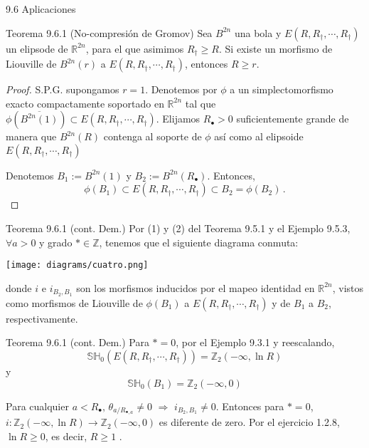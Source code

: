 \documentclass{beamer}
\begin{document}
\begin{frame}{9.6 Aplicaciones}
\begin{block}{Teorema 9.6.1 (No-compresi\'on de Gromov) } Sea $B^{2n}$ una bola y $E(R,R_{\dagger},\cdots,R_{\dagger})$ un elipsode de $\mathbb{R}^{2n}$, para el que asimimos $R_{\dagger}\geq R$. Si existe un morfismo de Liouville de $B^{2n}(r)$ a $E(R,R_{\dagger},\cdots,R_{\dagger})$, entonces $R\geq r$.
\end{block}
\begin{proof}\renewcommand{\qedsymbol}{}
S.P.G. supongamos $r=1$. Denotemos por $\phi$ a un simplectomorfismo exacto compactamente soportado en $\mathbb{R}^{2n}$ tal que $\phi(\overline{B^{2n}(1)})\subset E(R,R_{\dagger},\cdots,R_{\dagger})$. Elijamos $R_{\bullet}>0$ suficientemente grande de manera que $B^{2n}(R)$ contenga al soporte de $\phi$ as\'i como al elipsoide $E(R,R_{\dagger},\cdots,R_{\dagger})$

Denotemos $B_1:=B^{2n}(1)$ y $B_2:=B^{2n}(R_{\bullet})$. Entonces,
$$\phi(B_1)\subset E(R,R_{\dagger},\cdots,R_{\dagger})\subset B_{2}=\phi(B_2)\,.$$
\end{proof}
\end{frame}

\begin{frame}{Teorema 9.6.1 (cont. Dem.)}
Por (1) y (2) del Teorema 9.5.1 y el Ejemplo 9.5.3, $\forall a>0$ y grado $\ast\in \mathbb{Z}$, tenemos que el siguiente diagrama conmuta:
\begin{center}
\texttt{[image: diagrams/cuatro.png]}
\end{center}
donde $i$ e $i_{B_2,B_1}$ son los morfismos inducidos por el mapeo identidad en $\mathbb{R}^{2n}$, vistos como morfismos de Liouville de $\phi(B_1)$ a $E(R,R_{\dagger},\cdots,R_{\dagger})$ y de $B_{1}$ a $B_{2}$, respectivamente.
\end{frame}


\begin{frame}{Teorema 9.6.1 (cont. Dem.)}
Para $\ast=0$, por el Ejemplo 9.3.1 y reescalando, $$\mathbb{SH}_{0}(E(R,R_{\dagger},\cdots,R_{\dagger}))=\mathbb{Z}_{2}(-\infty,\ln R)$$ y $$\mathbb{SH}_{0}(B_1)=\mathbb{Z}_2(-\infty,0)$$

Para cualquier $a<R_{\bullet},\, \theta_{a/R_{\bullet,a}}\neq 0$ $\Rightarrow$ $i_{B_2,B_1}\neq 0$. Entonces para $\ast=0$, $i:\mathbb{Z}_2(-\infty,\ln R)\rightarrow \mathbb{Z}_2(-\infty,0)$ es diferente de zero. Por el ejercicio 1.2.8, $\ln R\geq 0$, es decir, $R\geq 1$ .
\end{frame}
\end{document}
